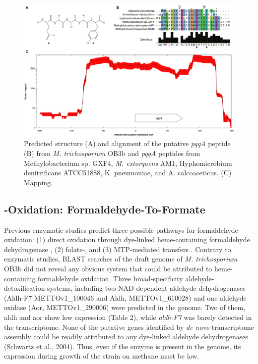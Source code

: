 \begin{figure}[H]
\centering
     \includegraphics[width=1.0\textwidth]{./tex/chapter1/figures/figure2.png}
     \begin{singlespace}
     \caption[\textit{pqqA} structure, alignment, and RNA-seq coverage]{
        Predicted structure
        (A) and alignment of the putative \textit{pqqA} peptide
        (B) from \textit{M. trichosporium} OB3b and \textit{pqqA} peptides from Methylobacterium sp. GXF4, \textit{M. extorquens} AM1,
            Hyphomicrobium denitrificans ATCC51888, K. pneumoniae, and A. calcoaceticus.
        (C) Mapping.}
     \end{singlespace}
     \label{fig:B_pqqA}
\end{figure}


\subsection{-Oxidation: Formaldehyde-To-Formate}
Previous enzymatic studies predict three possible pathways for formaldehyde oxidation: (1) direct oxidation through dye-linked heme-containing formaldehyde dehydrogenase \cite{patel1980}, (2) folate-, and (3) MTP-mediated  transfers \cite{vorholt1999, doronina2008}.
Contrary to enzymatic studies, BLAST searches of the draft genome of \textit{M. trichosporium} OB3b did not reveal any obvious system that could be attributed to heme-containing formaldehyde oxidation.
Three broad-specificity aldehyde-detoxification systems, including two NAD-dependent aldehyde dehydrogenases (Aldh-F7 METTOv1\_100046 and Aldh, METTOv1\_610028) and one aldehyde oxidase (Aor, METTOv1\_290006) were predicted in the genome.
Two of them, aldh and aor show low expression (Table 2), while \textit{aldh-F7} was barely detected in the transcriptome.
None of the putative genes identified by \textit{de novo} transcriptome assembly could be readily attributed to any dye-linked aldehyde dehydrogenases (Schwartz et al., 2004).
Thus, even if the enzyme is present in the genome, its expression during growth of the strain on methane must be low.

